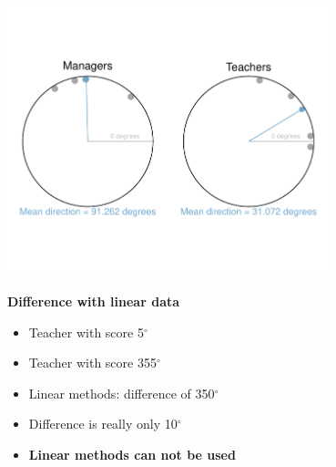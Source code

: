 \documentclass{beamer}
\begin{document}
\begin{frame}
\begin{center}

\includegraphics[width=0.7\textwidth, clip=true, trim=0.4cm 2cm 0.4cm 2cm]{ManagersTeachers.pdf}
\vspace{0.5cm}

\pause

\textbf{Difference with linear data} \pause
\begin{itemize}
	\item Teacher with score 5$^\circ$ \pause
	\item Teacher with score 355$^\circ$ \pause
	\item Linear methods: difference of 350$^\circ$ \pause
	\item Difference is really only 10$^\circ$ \pause
	\item \textbf{Linear methods can not be used}
\end{itemize}

\end{center}
\end{frame}
\end{document}
